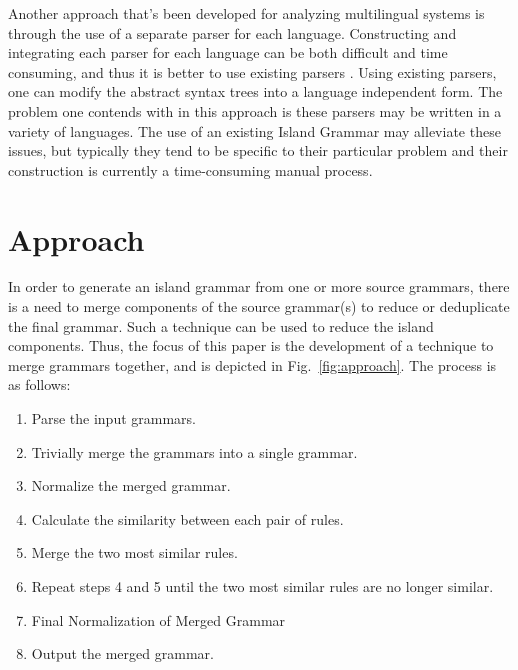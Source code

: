 \documentclass[conference]{IEEEtran}
\providecommand{\tightlist}{%
  \setlength{\itemsep}{0pt}\setlength{\parskip}{0pt}}
\begin{document}
Another approach that's been developed for analyzing multilingual
systems is through the use of a separate parser for each language.
Constructing and integrating each parser for each language can be both
difficult and time consuming, and thus it is better to use existing
parsers \cite{janesHowCalculateSoftware2013}. Using existing parsers,
one can modify the abstract syntax trees into a language independent
form. The problem one contends with in this approach is these parsers
may be written in a variety of languages. The use of an existing Island
Grammar \cite{synytskyyRobustMultilingualParsing2003} may alleviate
these issues, but typically they tend to be specific to their particular
problem and their construction is currently a time-consuming manual
process.

\hypertarget{sec:approach}{%
\section{Approach}\label{sec:approach}}

In order to generate an island grammar from one or more source grammars,
there is a need to merge components of the source grammar(s) to reduce
or deduplicate the final grammar. Such a technique can be used to reduce
the island components. Thus, the focus of this paper is the development
of a technique to merge grammars together, and is depicted in
Fig.~\ref{fig:approach}. The process is as follows:

\begin{enumerate}
\def\labelenumi{\arabic{enumi}.}
\tightlist
\item
  Parse the input grammars.
\item
  Trivially merge the grammars into a single grammar.
\item
  Normalize the merged grammar.
\item
  Calculate the similarity between each pair of rules.
\item
  Merge the two most similar rules.
\item
  Repeat steps 4 and 5 until the two most similar rules are no longer
  similar.
\item
  Final Normalization of Merged Grammar
\item
  Output the merged grammar.
\end{enumerate}
\end{document}
